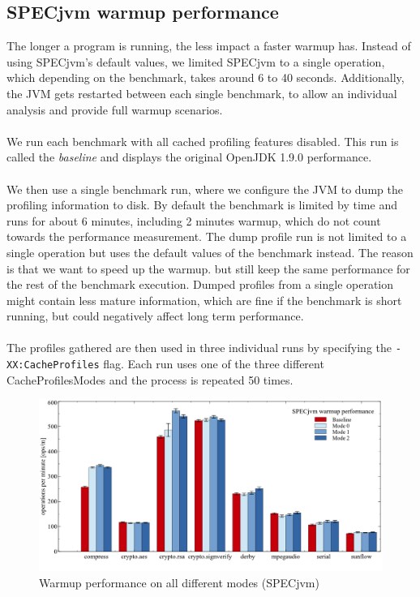 \subsection{SPECjvm warmup performance}
\label{s:perf_specjvm_warmup}
The longer a program is running, the less impact a faster warmup has. 
Instead of using SPECjvm's default values, we limited SPECjvm to a single operation, which depending on the benchmark, takes around 6 to 40 seconds.
Additionally, the JVM gets restarted between each single benchmark, to allow an individual analysis and provide full warmup scenarios.
\\\\
We run each benchmark with all cached profiling features disabled. This run is called the \textit{baseline} and displays the original OpenJDK 1.9.0 performance.    
\\\\ 
We then use a single benchmark run, where we configure the JVM to dump the profiling information to disk. By default the benchmark is limited by time and runs for about 6 minutes, including 2 minutes warmup, which do not count towards the performance measurement. The dump profile run is not limited to a single operation but uses the default values of the benchmark instead. The reason is that we want to speed up the warmup. but still keep the same performance for the rest of the benchmark execution. Dumped profiles from a single operation might contain less mature information, which are fine if the benchmark is short running, but could negatively affect long term performance.
\\\\
The profiles gathered are then used in three individual runs by specifying the \texttt{-XX:CacheProfiles} flag. Each run uses one of the three different CacheProfilesModes and the process is repeated 50 times.
\begin{figure}[ht!]
  \begin{center}
    \centering
    \includegraphics[width=1.0\textwidth]{figures/others_warmup.png}
    \caption{Warmup performance on all different modes (SPECjvm)}
    \label{f:others_warmup}
  \end{center}
\end{figure}
